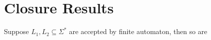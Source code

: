 \documentclass{aq-notes}
\begin{document}
\section{Closure Results}
\begin{theorem}
    Suppose $L_1,L_2\subseteq \Sigma^*$ are accepted by finite automaton, then so are\\

\end{theorem}
\end{document}
